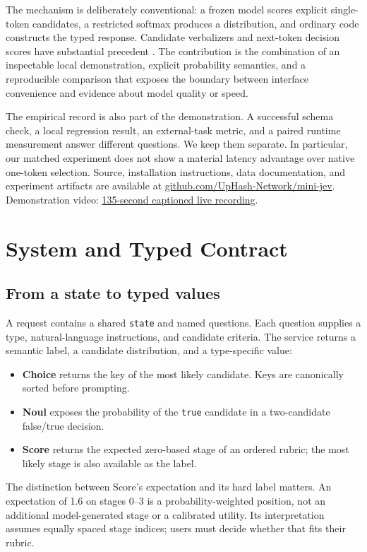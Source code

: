 \documentclass[11pt]{article}
\newcommand{\CodeURL}{\href{https://github.com/UpHash-Network/mini-jev/tree/research/eacl2027-demo}{github.com/UpHash-Network/mini-jev}}
\newcommand{\DemoVideo}{\href{https://raw.githubusercontent.com/UpHash-Network/mini-jev/refs/heads/research/eacl2027-demo/paper/eacl2027/Mini_Jev_Demonstration.mp4}{135-second captioned live recording}}
\begin{document}
The mechanism is deliberately conventional: a frozen model scores explicit single-token candidates, a restricted softmax produces a distribution, and ordinary code constructs the typed response. Candidate verbalizers and next-token decision scores have substantial precedent \citep{schick2021pet,zhang2025qwen3embedding}. The contribution is the combination of an inspectable local demonstration, explicit probability semantics, and a reproducible comparison that exposes the boundary between interface convenience and evidence about model quality or speed.

The empirical record is also part of the demonstration. A successful schema check, a local regression result, an external-task metric, and a paired runtime measurement answer different questions. We keep them separate. In particular, our matched experiment does not show a material latency advantage over native one-token selection. Source, installation instructions, data documentation, and experiment artifacts are available at \CodeURL. Demonstration video: \DemoVideo.

\section{System and Typed Contract}
\label{sec:system}
\subsection{From a state to typed values}
A request contains a shared \texttt{state} and named questions. Each question supplies a type, natural-language instructions, and candidate criteria. The service returns a semantic label, a candidate distribution, and a type-specific value:
\begin{itemize}
  \item \textbf{Choice} returns the key of the most likely candidate. Keys are canonically sorted before prompting.
  \item \textbf{Noul} exposes the probability of the \texttt{true} candidate in a two-candidate false/true decision.
  \item \textbf{Score} returns the expected zero-based stage of an ordered rubric; the most likely stage is also available as the label.
\end{itemize}
The distinction between Score's expectation and its hard label matters. An expectation of 1.6 on stages 0--3 is a probability-weighted position, not an additional model-generated stage or a calibrated utility. Its interpretation assumes equally spaced stage indices; users must decide whether that fits their rubric.
\end{document}
